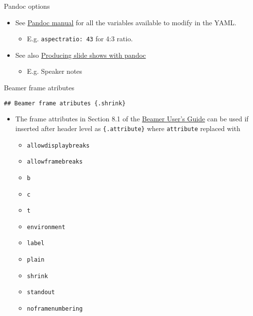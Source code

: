 \documentclass[
  10pt,
  ignorenonframetext,
  aspectratio=169,
]{beamer}
\providecommand{\tightlist}{%
  \setlength{\itemsep}{0pt}\setlength{\parskip}{0pt}}
\begin{document}
\begin{frame}[fragile]{Pandoc options}
\protect\hypertarget{pandoc-options}{}

\begin{itemize}
\tightlist
\item
  See
  \href{https://pandoc.org/MANUAL.html\#variables-for-beamer-slides}{Pandoc
  manual} for all the variables available to modify in the YAML.

  \begin{itemize}
  \tightlist
  \item
    E.g. \texttt{aspectratio:\ 43} for 4:3 ratio.
  \end{itemize}
\item
  See also
  \href{https://pandoc.org/MANUAL.html\#producing-slide-shows-with-pandoc}{Producing
  slide shows with pandoc}

  \begin{itemize}
  \tightlist
  \item
    E.g. Speaker notes
  \end{itemize}
\end{itemize}

\end{frame}

\begin{frame}{Beamer frame atributes}
\protect\hypertarget{beamer-frame-atributes}{}

\begin{verbatim}
## Beamer frame atributes {.shrink}
\end{verbatim}

\begin{itemize}
\tightlist
\item
  The frame attributes in Section 8.1 of the
  \href{http://mirror.aarnet.edu.au/pub/CTAN/macros/latex/contrib/beamer/doc/beameruserguide.pdf}{Beamer
  User's Guide} can be used if inserted after header level as
  \texttt{\{.attribute\}} where \texttt{attribute} replaced with

  \begin{itemize}
  \tightlist
  \item
    \texttt{allowdisplaybreaks}
  \item
    \texttt{allowframebreaks}
  \item
    \texttt{b}
  \item
    \texttt{c}
  \item
    \texttt{t}
  \item
    \texttt{environment}
  \item
    \texttt{label}
  \item
    \texttt{plain}
  \item
    \texttt{shrink}
  \item
    \texttt{standout}
  \item
    \texttt{noframenumbering}
  \end{itemize}
\end{itemize}

\end{frame}
\end{document}
